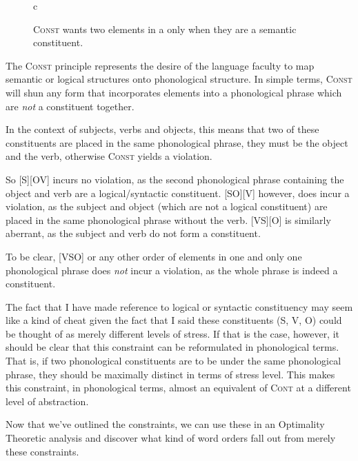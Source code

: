 \documentclass{article}
\newcommand{\cont}{\textsc{Cont}}
\newcommand{\cons}{\textsc{Const}}
\begin{document}
\begin{figure}
\begin{center}
\begin{tableau}{c}
		\const{\cons}
	\cand{[SO][V]} \vio{*!}
	\cand[\Optimal]{[S][VO]} \vio{}
\end{tableau}
\end{center}
	\caption{{\cons} wants two elements in a {\textphi} only when they are a semantic constituent.}
\end{figure}

The {\cons} principle represents the desire of the language faculty to map semantic or logical structures onto phonological structure.
In simple terms, {\cons} will shun any form that incorporates elements into a phonological phrase which are \emph{not} a constituent together.

In the context of subjects, verbs and objects, this means that two of these constituents are placed in the same phonological phrase, they must be the object and the verb, otherwise {\cons} yields a violation.

So [S][OV] incurs no violation, as the second phonological phrase containing the object and verb are a logical/syntactic constituent.
[SO][V] however, does incur a violation, as the subject and object (which are not a logical constituent) are placed in the same phonological phrase without the verb.
[VS][O] is similarly aberrant, as the subject and verb do not form a constituent.

To be clear, [VSO] or any other order of elements in one and only one phonological phrase does \emph{not} incur a violation, as the whole phrase is indeed a constituent.

 The fact that I have made reference to logical or syntactic constituency may seem like a kind of cheat given the fact that I said these constituents (S, V, O) could be thought of as merely different levels of stress.
 If that is the case, however, it should be clear that this constraint can be reformulated in phonological terms.
 That is, if two phonological constituents are to be under the same phonological phrase, they should be maximally distinct in terms of stress level.
 This makes this constraint, in phonological terms, almost an equivalent of {\cont} at a different level of abstraction.

 Now that we've outlined the constraints, we can use these in an Optimality Theoretic analysis and discover what kind of word orders fall out from merely these constraints.
\end{document}
